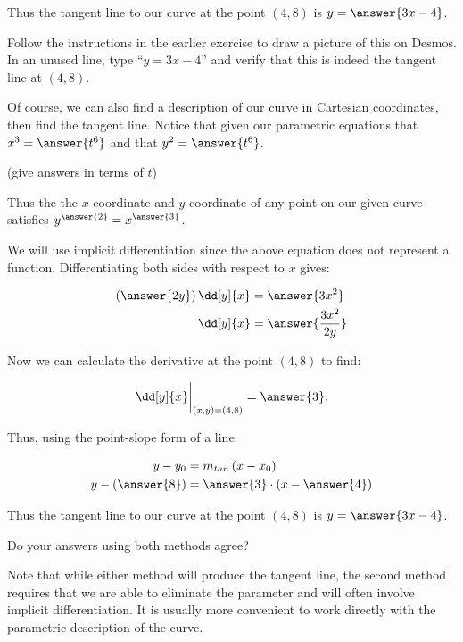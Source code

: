 \documentclass{ximera}
\begin{document}
\begin{exercise}
\begin{exercise}
Thus the tangent line to our curve at the point $(4, 8)$ is $y=\answer{3x-4}$. 

\begin{exercise}
Follow the instructions in the earlier exercise to draw a picture of this on Desmos. In an unused line, type ``$y=3x-4$'' and verify that this is indeed the tangent line at $(4,8)$.
\end{exercise}
\end{exercise}
\begin{exercise}
Of course, we can also find a description of our curve in Cartesian coordinates, then find the tangent line.  Notice that given our parametric equations that $x^3=\answer{t^6}$ and that $y^2=\answer{t^6}$.

(give answers in terms of $t$)

Thus the the $x$-coordinate and $y$-coordinate of any point on our given curve satisfies $y^{\answer{2}}=x^{\answer{3}}$. 

We will use implicit differentiation since the above equation does not represent a function.  Differentiating both sides with respect to $x$ gives:

\begin{align*}
\left(\answer{2y}\right)\dd[y]{x} &= \answer{3x^2} \\
\dd[y]{x} &= \answer{\frac{3x^2}{2y}}
\end{align*}

\begin{exercise}
Now we can calculate the derivative at the point $(4,8)$ to find:

\[
\dd[y]{x}\bigg|_{(x,y)=(4,8)} = \answer{3}.
\]

Thus, using the point-slope form of a line:

\begin{align*}
y-y_0& = m_{tan}\left(x-x_0\right) \\
y-\left(\answer{8}\right)& =\answer{3} \cdot \left(x-\answer{4}\right) \\
\end{align*}

Thus the tangent line to our curve at the point $(4, 8)$ is $y=\answer{3x-4}$. 
\end{exercise}
\end{exercise}

Do your answers using both methods agree?

\begin{multipleChoice}
\end{multipleChoice}

\begin{remark}
Note that while either method will produce the tangent line, the second method requires that we are able to eliminate the parameter and will often involve implicit differentiation.  It is usually more convenient to work directly with the parametric description of the curve.
\end{remark}
\end{exercise}
\end{document}
